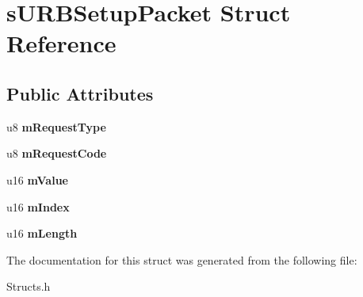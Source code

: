 \hypertarget{structsURBSetupPacket}{\section{s\-U\-R\-B\-Setup\-Packet \-Struct \-Reference}
\label{structsURBSetupPacket}
}
\subsection*{\-Public \-Attributes}
\begin{DoxyCompactItemize}
\item 
\hypertarget{structsURBSetupPacket_a54061e0f11562d1f733e610165027b21}{u8 {\bfseries m\-Request\-Type}}\label{structsURBSetupPacket_a54061e0f11562d1f733e610165027b21}

\item 
\hypertarget{structsURBSetupPacket_ab2fa8f5fe96928f0fb5c40e208a53aed}{u8 {\bfseries m\-Request\-Code}}\label{structsURBSetupPacket_ab2fa8f5fe96928f0fb5c40e208a53aed}

\item 
\hypertarget{structsURBSetupPacket_a350bb6c815747cf144d0f3aa9cc8f111}{u16 {\bfseries m\-Value}}\label{structsURBSetupPacket_a350bb6c815747cf144d0f3aa9cc8f111}

\item 
\hypertarget{structsURBSetupPacket_aaeb50cea92ebaee3829c9276a661b434}{u16 {\bfseries m\-Index}}\label{structsURBSetupPacket_aaeb50cea92ebaee3829c9276a661b434}

\item 
\hypertarget{structsURBSetupPacket_aad77a2e8aed92d8644df265c81b38068}{u16 {\bfseries m\-Length}}\label{structsURBSetupPacket_aad77a2e8aed92d8644df265c81b38068}

\end{DoxyCompactItemize}


\-The documentation for this struct was generated from the following file\-:\begin{DoxyCompactItemize}
\item 
\-Structs.\-h\end{DoxyCompactItemize}
